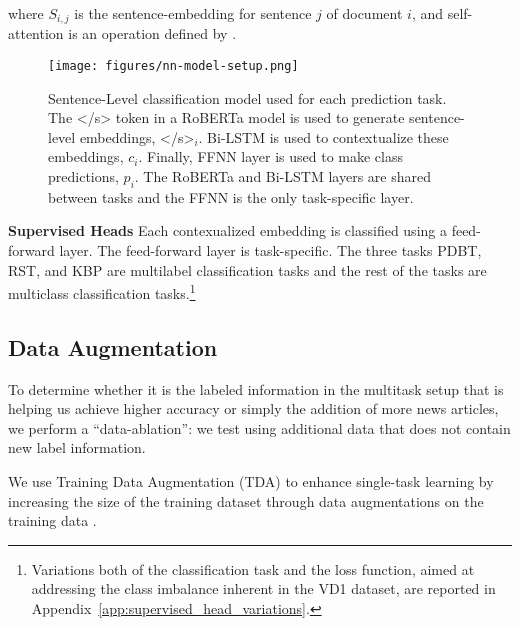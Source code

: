 \documentclass[11pt]{article}
\newcommand\nd{VD1\xspace}
\begin{document}
\noindent where $S_{i, j}$ is the sentence-embedding for sentence $j$ of document $i$, and self-attention is an operation defined by \citet{cheng2016long}. 


\begin{figure}[t]
    \centering
    \texttt{[image: figures/nn-model-setup.png]}
    \caption{Sentence-Level classification model used for each prediction task. The </s> token in a RoBERTa model is used to generate sentence-level embeddings, </s>$_i$. Bi-LSTM is used to contextualize these embeddings, $c_i$. Finally, FFNN layer is used to make class predictions, $p_i$. The RoBERTa and Bi-LSTM layers are shared between tasks and the FFNN is the only task-specific layer.}
    \label{fig:nn_model}
\end{figure}

\noindent\textbf{Supervised Heads} Each contexualized embedding is classified using a feed-forward layer. The feed-forward layer is task-specific. The three tasks PDBT, RST, and KBP are multilabel classification tasks and the rest of the tasks are multiclass classification tasks.\footnote{Variations both of the classification task and the loss function, aimed at addressing the class imbalance inherent in the \nd dataset, are reported in Appendix~\ref{app:supervised_head_variations}.}

\subsection{Data Augmentation}
\label{sct:data_aug}

To determine whether it is the labeled information in the multitask setup that is helping us achieve higher accuracy or simply the addition of more news articles, we perform a ``data-ablation'': we test using additional data that does not contain new label information. 

We use Training Data Augmentation (TDA) to enhance single-task learning by increasing the size of the training dataset through data augmentations on the training data \cite{devries2017dataset}. 
\end{document}

